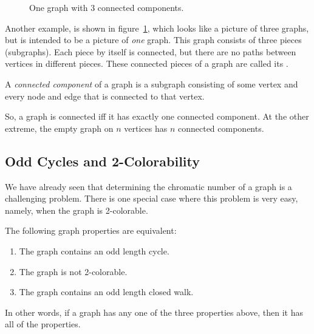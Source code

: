 \begin{figure}[htbp]


\caption{One graph with 3 connected components.}

\label{fig:3comp}
\end{figure}

Another example, is shown in figure~\ref{fig:3comp}, which looks like a
picture of three graphs, but is intended to be a picture of \emph{one}
graph.  This graph consists of three pieces (subgraphs).  Each piece
by itself is connected, but there are no paths between vertices in
different pieces.  These connected pieces of a graph are called its
.

\begin{definition}\label{def:connected-component}
A \emph{connected component} of a graph is a subgraph consisting of
some vertex and every node and edge that is connected to that vertex.
\end{definition}

So, a graph is connected iff it has exactly one connected component.
At the other extreme, the empty graph on $n$ vertices has $n$
connected components.


\subsection{Odd Cycles and 2-Colorability}\label{subsec:odd_cycles}

We have already seen that determining the chromatic number of a graph is a
challenging problem.  There is one special case where this problem is very
easy, namely, when the graph is 2-colorable.

\begin{theorem}\label{thm:2-colorable-equiv}
The following graph properties are equivalent:

\begin{enumerate}

\item\label{has-odd-cycle}
The graph contains an odd length cycle.

\item\label{not-2-color}
The graph is not 2-colorable.

\item\label{has-odd-closed-walk}
The graph contains an odd length closed walk.

\end{enumerate}
\end{theorem}
In other words, if a graph has any one of the three properties above, then
it has all of the properties.

